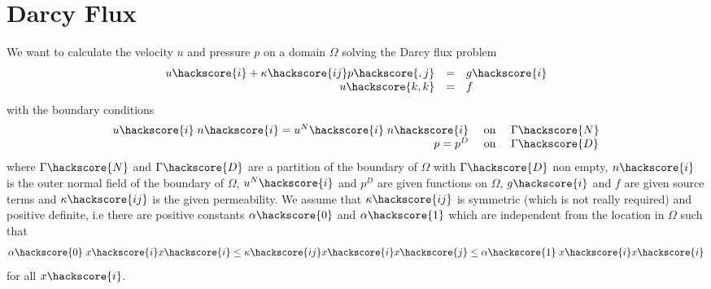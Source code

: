 \section{Darcy Flux}
\label{DARCY FLUX}
We want to calculate the velocity $u$ and pressure $p$ on a domain $\Omega$ solving 
the Darcy flux problem 
\begin{equation}\label{DARCY PROBLEM}
\begin{array}{rcl}
u\hackscore{i} + \kappa\hackscore{ij} p\hackscore{,j} & = & g\hackscore{i} \\
u\hackscore{k,k} & = & f
\end{array}
\end{equation} 
with the boundary conditions
\begin{equation}\label{DARCY BOUNDARY}
\begin{array}{rcl}
u\hackscore{i} \; n\hackscore{i}  = u^{N}\hackscore{i}  \; n\hackscore{i} & \mbox{ on } & \Gamma\hackscore{N} \\
p = p^{D} &  \mbox{ on } & \Gamma\hackscore{D} \\ 
\end{array}
\end{equation} 
where $\Gamma\hackscore{N}$ and $\Gamma\hackscore{D}$ are a partition of the boundary of $\Omega$ with $\Gamma\hackscore{D}$ non empty, $n\hackscore{i}$ is the outer normal field of the boundary of $\Omega$, $u^{N}\hackscore{i}$ and $p^{D}$ are given functions on $\Omega$, $g\hackscore{i}$ and $f$ are given source terms and $\kappa\hackscore{ij}$ is the given permeability. We assume that $\kappa\hackscore{ij}$ is symmetric (which is not really required) and positive definite, i.e there are positive constants $\alpha\hackscore{0}$ and $\alpha\hackscore{1}$ which are independent from the location in $\Omega$ such that
\begin{equation}
\alpha\hackscore{0} \; x\hackscore{i} x\hackscore{i} \le \kappa\hackscore{ij} x\hackscore{i} x\hackscore{j} \le \alpha\hackscore{1} \; x\hackscore{i} x\hackscore{i}
\end{equation}
for all $x\hackscore{i}$. 

